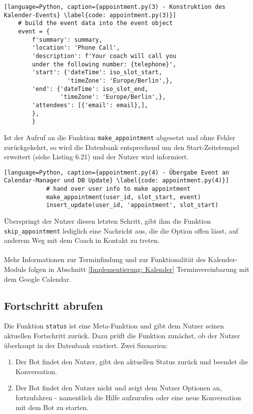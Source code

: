             \begin{lstlisting}[language=Python, caption={appointment.py(3) - Konstruktion des Kalender-Events} \label{code: appointment.py(3)}]
    # build the event data into the event object
    event = {
        f'summary': summary,
        'location': 'Phone Call',
        'description': f'Your coach will call you 
        under the following number: {telephone}',
        'start': {'dateTime': iso_slot_start,
                  'timeZone': 'Europe/Berlin',},
        'end': {'dateTime': iso_slot_end,
                'timeZone': 'Europe/Berlin',},
        'attendees': [{'email': email},],
        },
        }
            \end{lstlisting}
            
            Ist der Aufruf an die Funktion \verb|make_appointment| abgesetzt und ohne Fehler zurückgekehrt, so wird die Datenbank entsprechend um den Start-Zeitstempel erweitert (siehe Listing 6.21) und der Nutzer wird informiert. 
            \begin{lstlisting}[language=Python, caption={appointment.py(4) - Übergabe Event an Calendar-Manager und DB Update} \label{code: appointment.py(4)}]
            # hand over user info to make appointment
            make_appointment(user_id, slot_start, event) 
            insert_update(user_id, 'appointment', slot_start)
            \end{lstlisting}

            Überspringt der Nutzer diesen letzten Schritt, gibt ihm die Funktion \\\verb|skip_appointment| lediglich eine Nachricht aus, die die Option offen lässt, auf anderem Weg mit dem Coach in Kontakt zu treten. \\
            \\
            Mehr Informationen zur Terminfindung und zur Funktionalität des Kalender-Moduls folgen in Abschnitt \ref*{Implementierung: Kalender} Terminvereinbarung mit dem Google Calendar.

        \subsection{Fortschritt abrufen} \label{Implementierung: status.py}
            Die Funktion \verb|status| ist eine Meta-Funktion und gibt dem Nutzer seinen aktuellen Fortschritt zurück. Dazu prüft die Funktion zunächst, ob der Nutzer überhaupt in der Datenbank existiert. Zwei Szenarien: 
            \begin{enumerate}
                \item Der Bot findet den Nutzer, gibt den aktuellen Status zurück und beendet die Konversation.
                \item Der Bot findet den Nutzer nicht und zeigt dem Nutzer Optionen an, fortzufahren - namentlich die Hilfe aufzurufen oder eine neue Konversation mit dem Bot zu starten.
            \end{enumerate}







